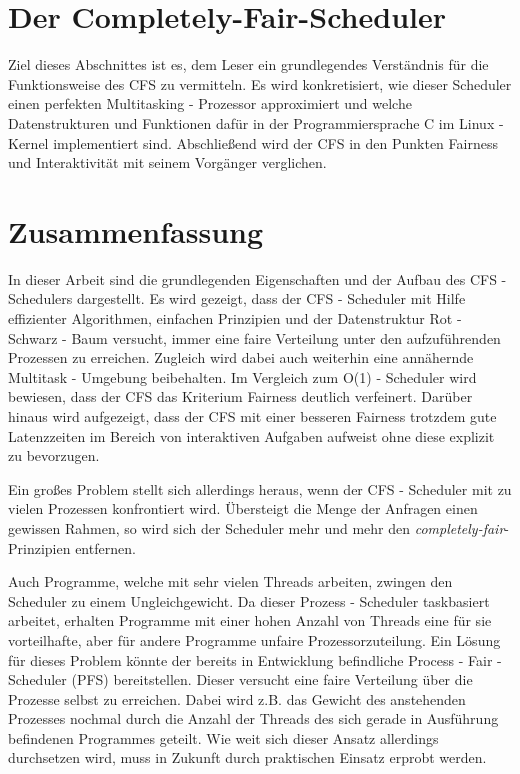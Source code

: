 \documentclass[ngerman]{seminarvorlage}
\begin{document}





\section{Der Completely-Fair-Scheduler}\label{s:cfsmain}
Ziel dieses Abschnittes ist es, dem Leser ein grundlegendes Verständnis für die Funktionsweise des CFS zu vermitteln. Es wird konkretisiert, wie dieser Scheduler einen perfekten Multitasking - Prozessor approximiert und welche Datenstrukturen und Funktionen dafür in der Programmiersprache C im Linux - Kernel implementiert sind. Abschließend wird der CFS in den Punkten Fairness und Interaktivität mit seinem Vorgänger verglichen.





\section{Zusammenfassung}\label{s:end}
In dieser Arbeit sind die grundlegenden Eigenschaften und der Aufbau des CFS - Schedulers dargestellt. Es wird gezeigt, dass der CFS - Scheduler mit Hilfe effizienter Algorithmen, einfachen Prinzipien und der Datenstruktur Rot - Schwarz - Baum versucht, immer eine faire Verteilung unter den aufzuführenden Prozessen zu erreichen. Zugleich wird dabei auch weiterhin eine annähernde Multitask - Umgebung beibehalten. Im Vergleich zum O(1) - Scheduler wird bewiesen, dass der CFS das Kriterium Fairness deutlich verfeinert. Darüber hinaus wird aufgezeigt, dass der CFS mit einer besseren Fairness trotzdem gute Latenzzeiten im Bereich von interaktiven Aufgaben aufweist ohne diese explizit zu bevorzugen.

Ein großes Problem stellt sich allerdings heraus, wenn der CFS - Scheduler mit zu vielen Prozessen konfrontiert wird. Über\-steigt die Menge der Anfragen einen gewissen Rahmen, so wird sich der Scheduler mehr und mehr den  \textit{com\-pletely-fair}-Prinzipien entfernen.  

Auch Programme, welche mit sehr vielen Threads arbeiten, zwingen den Scheduler zu einem Ungleichgewicht. Da dieser Prozess - Scheduler taskbasiert arbeitet, erhalten Programme mit einer hohen Anzahl von Threads eine für sie vorteilhafte, aber für andere Programme unfaire Prozessorzuteilung. Ein Lösung für dieses Problem könnte der bereits in Entwicklung befindliche Process - Fair - Scheduler (PFS) bereitstellen. Dieser versucht eine faire Verteilung über die Prozesse selbst zu erreichen. Dabei wird z.B. das Gewicht des anstehenden Prozesses nochmal durch die Anzahl der Threads des sich gerade in Ausführung befindenen Programmes geteilt. Wie weit sich dieser Ansatz allerdings durchsetzen wird, muss in Zukunft durch praktischen Einsatz erprobt werden.
\end{document}
